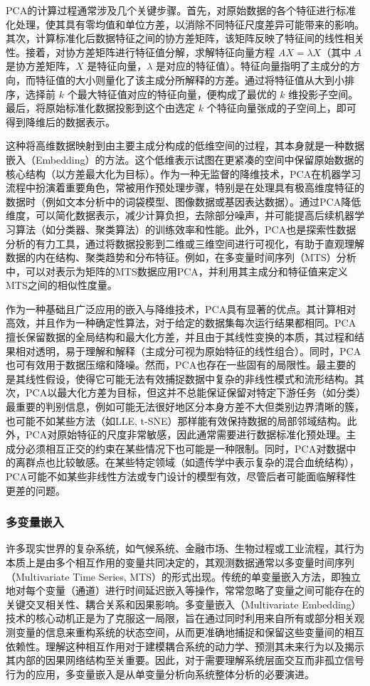 PCA的计算过程通常涉及几个关键步骤。首先，对原始数据的各个特征进行标准化处理，使其具有零均值和单位方差，以消除不同特征尺度差异可能带来的影响。其次，计算标准化后数据特征之间的协方差矩阵，该矩阵反映了特征间的线性相关性。接着，对协方差矩阵进行特征值分解，求解特征向量方程 $AX=\lambda X$（其中 $A$ 是协方差矩阵，$X$ 是特征向量，$\lambda$ 是对应的特征值）。特征向量指明了主成分的方向，而特征值的大小则量化了该主成分所解释的方差。通过将特征值从大到小排序，选择前 $k$ 个最大特征值对应的特征向量，便构成了最优的 $k$ 维投影子空间。最后，将原始标准化数据投影到这个由选定 $k$ 个特征向量张成的子空间上，即可得到降维后的数据表示。

这种将高维数据映射到由主要主成分构成的低维空间的过程，其本身就是一种数据嵌入（Embedding）的方法\cite{gibson1992analytic}。这个低维表示试图在更紧凑的空间中保留原始数据的核心结构（以方差最大化为目标）。作为一种无监督的降维技术，PCA在机器学习流程中扮演着重要角色，常被用作预处理步骤，特别是在处理具有极高维度特征的数据时（例如文本分析中的词袋模型、图像数据或基因表达数据）。通过PCA降低维度，可以简化数据表示，减少计算负担，去除部分噪声，并可能提高后续机器学习算法（如分类器、聚类算法）的训练效率和性能。此外，PCA也是探索性数据分析的有力工具，通过将数据投影到二维或三维空间进行可视化，有助于直观理解数据的内在结构、聚类趋势和分布特征。例如，在多变量时间序列（MTS）分析中，可以对表示为矩阵的MTS数据应用PCA，并利用其主成分和特征值来定义MTS之间的相似性度量。

作为一种基础且广泛应用的嵌入与降维技术，PCA具有显著的优点。其计算相对高效，并且作为一种确定性算法，对于给定的数据集每次运行结果都相同。PCA擅长保留数据的全局结构和最大化方差，并且由于其线性变换的本质，其过程和结果相对透明，易于理解和解释（主成分可视为原始特征的线性组合）。同时，PCA也可有效用于数据压缩和降噪。然而，PCA也存在一些固有的局限性。最主要的是其线性假设，使得它可能无法有效捕捉数据中复杂的非线性模式和流形结构。其次，PCA以最大化方差为目标，但这并不总能保证保留对特定下游任务（如分类）最重要的判别信息，例如可能无法很好地区分本身方差不大但类别边界清晰的簇，也可能不如某些方法（如LLE, t-SNE）那样能有效保持数据的局部邻域结构。此外，PCA对原始特征的尺度非常敏感，因此通常需要进行数据标准化预处理。主成分必须相互正交的约束在某些情况下也可能是一种限制。同时，PCA对数据中的离群点也比较敏感。在某些特定领域（如遗传学中表示复杂的混合血统结构），PCA可能不如某些非线性方法或专门设计的模型有效，尽管后者可能面临解释性更差的问题。

\subsubsection{多变量嵌入}
许多现实世界的复杂系统，如气候系统、金融市场、生物过程或工业流程，其行为本质上是由多个相互作用的变量共同决定的，其观测数据通常以多变量时间序列（Multivariate Time Series, MTS）的形式出现。传统的单变量嵌入方法，即独立地对每个变量（通道）进行时间延迟嵌入等操作，常常忽略了变量之间可能存在的关键交叉相关性、耦合关系和因果影响。多变量嵌入（Multivariate Embedding）技术\cite{barnard2001embedding}的核心动机正是为了克服这一局限，旨在通过同时利用来自所有或部分相关观测变量的信息来重构系统的状态空间，从而更准确地捕捉和保留这些变量间的相互依赖性。理解这种相互作用对于建模耦合系统的动力学、预测其未来行为以及揭示其内部的因果网络结构至关重要。因此，对于需要理解系统层面交互而非孤立信号行为的应用，多变量嵌入是从单变量分析向系统整体分析的必要演进。

